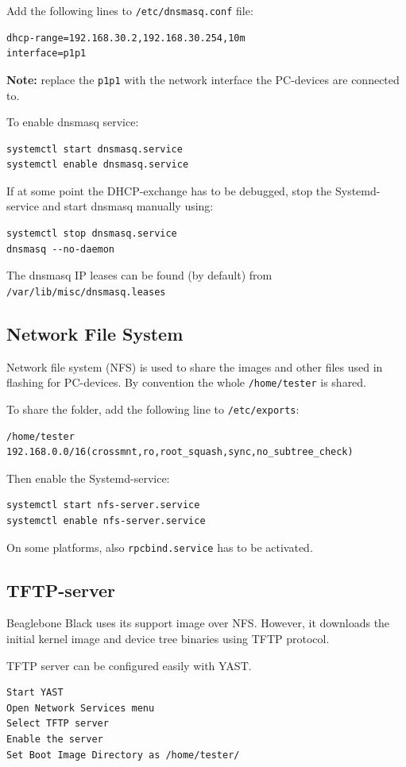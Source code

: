 \documentclass[a4paper,11pt]{article}
\newcommand{\note}{\textbf{Note: }}
\newcommand{\cmd}[1]{\texttt{#1}}
\begin{document}
Add the following lines to \cmd{/etc/dnsmasq.conf} file:
\begin{lstlisting}
dhcp-range=192.168.30.2,192.168.30.254,10m
interface=p1p1
\end{lstlisting}
\note{replace the \cmd{p1p1} with the network interface the PC-devices are connected to.}

To enable dnsmasq service:
\begin{lstlisting}
systemctl start dnsmasq.service
systemctl enable dnsmasq.service
\end{lstlisting}
If at some point the DHCP-exchange has to be debugged, stop the Systemd-service and start dnsmasq manually using:
\begin{lstlisting}
systemctl stop dnsmasq.service
dnsmasq --no-daemon
\end{lstlisting}

The dnsmasq IP leases can be found (by default) from \cmd{/var/lib/misc/dnsmasq.leases}

\subsection*{Network File System}
Network file system (NFS) is used to share the images and other files used in flashing for PC-devices. By convention the whole \cmd{/home/tester} is shared.

To share the folder, add the following line to \cmd{/etc/exports}:
\begin{lstlisting}
/home/tester 192.168.0.0/16(crossmnt,ro,root_squash,sync,no_subtree_check)
\end{lstlisting}

Then enable the Systemd-service:
\begin{lstlisting}
systemctl start nfs-server.service
systemctl enable nfs-server.service
\end{lstlisting}
On some platforms, also \cmd{rpcbind.service} has to be activated.

\subsection*{TFTP-server}

Beaglebone Black uses its support image over NFS. However, it downloads the initial kernel image and device tree binaries using TFTP protocol.

TFTP server can be configured easily with YAST.

\begin{lstlisting}
Start YAST
Open Network Services menu
Select TFTP server
Enable the server
Set Boot Image Directory as /home/tester/
\end{lstlisting}
\end{document}
